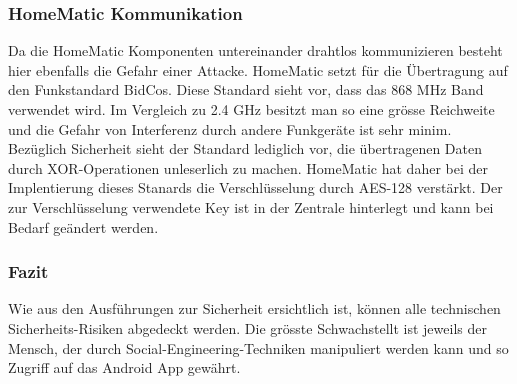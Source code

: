 \subsubsection{HomeMatic Kommunikation}
Da die HomeMatic Komponenten untereinander drahtlos kommunizieren besteht hier ebenfalls die Gefahr einer Attacke. HomeMatic setzt für die Übertragung auf den Funkstandard BidCos. Diese Standard sieht vor, dass das 868 MHz Band verwendet wird. Im Vergleich zu 2.4 GHz besitzt man so eine grösse Reichweite und die Gefahr von Interferenz durch andere Funkgeräte ist sehr minim.\\
Bezüglich Sicherheit sieht der Standard lediglich vor, die übertragenen Daten durch XOR-Operationen unleserlich zu machen. HomeMatic hat daher bei der Implentierung dieses Stanards die Verschlüsselung durch AES-128 verstärkt. Der zur Verschlüsselung verwendete Key ist in der Zentrale hinterlegt und kann bei Bedarf geändert werden.


\subsubsection{Fazit}
Wie aus den Ausführungen zur Sicherheit ersichtlich ist, können alle technischen Sicherheits-Risiken abgedeckt werden. Die grösste Schwachstellt ist jeweils der Mensch, der durch Social-Engineering-Techniken manipuliert werden kann und so Zugriff auf das Android App gewährt.